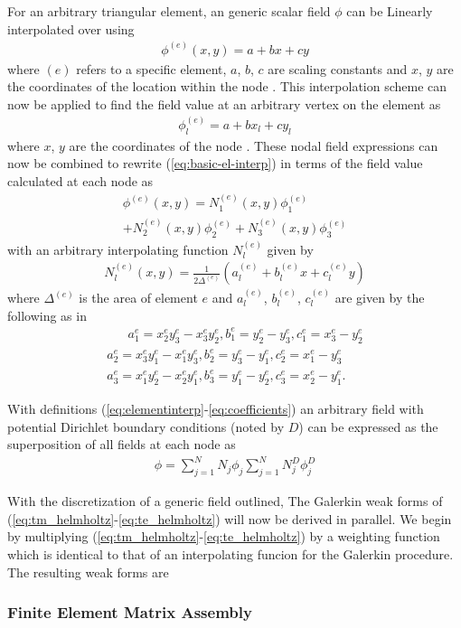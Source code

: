 For an arbitrary triangular element, an generic scalar field $\phi$ can be Linearly interpolated over using
\begin{align}
	\phi^{(e)}(x,y)=a+bx+cy
	\label{eq:basic-el-interp}
\end{align} 
where $(e)$ refers to a specific element, $a$, $b$, $c$ are scaling constants and $x$, $y$ are the coordinates of the location within the node \cite{jin2011theory}. This interpolation scheme can now be applied to find the field value at an arbitrary vertex on the element as
\begin{align}
	\phi^{(e)}_l=a+bx_l+cy_l
	\label{eq:node-interp}
\end{align}
where $x$, $y$ are the coordinates of the node \cite{jin2011theory}. These nodal field expressions can now be combined to rewrite (\ref{eq:basic-el-interp}) in terms of the field value calculated at each node as
\begin{multline}
	\phi^{(e)}(x,y)=N_1^{(e)}(x,y)\phi^{(e)}_1\\+N_2^{(e)}(x,y)\phi^{(e)}_2+N_3^{(e)}(x,y)\phi^{(e)}_3
	\label{eq:elementinterp}
\end{multline} with an arbitrary interpolating function $N_l^{(e)}$ given by 
\begin{align}
	N_l^{(e)}(x,y)=\frac{1}{2\Delta^{(e)}}\left(a_l^{(e)}+b_l^{(e)}x+c_l^{(e)}y\right)
\end{align}
where $\Delta^{(e)}$ is the area of element $e$ and $a_l^{(e)}$, $b_l^{(e)}$, $c_l^{(e)}$ are given by the following as in \cite{jin2011theory}
\begin{multline}
	\quad \ \ \ a_1^{e} = x^{e}_2y^{e}_3-x^{e}_3y^{e}_2,b_1^{e}=y^{e}_2-y^{e}_3, c_1^{e}=x^{e}_3-y^{e}_2
	\\
	a_2^{e} = x^{e}_3y^{e}_1-x^{e}_1y^{e}_3,b_2^{e}=y^{e}_3-y^{e}_1, c_2^{e}=x^{e}_1-y^{e}_3
	\\
	a_3^{e} = x^{e}_1y^{e}_2-x^{e}_2y^{e}_1,b_3^{e}=y^{e}_1-y^{e}_2, c_3^{e}=x^{e}_2-y^{e}_1.
	\label{eq:coefficients}
\end{multline}

With definitions (\ref{eq:elementinterp}-\ref{eq:coefficients}) an arbitrary field with potential Dirichlet boundary conditions (noted by $D$) can be expressed as the superposition of all fields at each node as 
\begin{align}
	\phi=\sum_{j=1}^{N}N_j\phi_j\sum_{j=1}^{N}N_j^D\phi_j^D
\end{align}

With the discretization of a generic field outlined, The Galerkin weak forms of (\ref{eq:tm_helmholtz}-\ref{eq:te_helmholtz}) will now be derived in parallel. We begin by multiplying (\ref{eq:tm_helmholtz}-\ref{eq:te_helmholtz}) by a weighting function which is identical to that of an interpolating funcion for the Galerkin procedure. The resulting weak forms are


\subsubsection{Finite Element Matrix Assembly}
\label{subsub:mat_assembly}